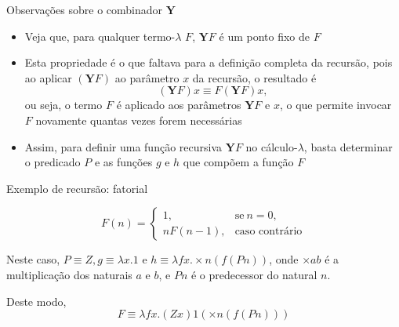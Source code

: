 \begin{frame}[fragile]{Observações sobre o combinador $\mathbf{Y}$}

    \begin{itemize}
        \item Veja que, para qualquer termo-$\lambda$ $F$, $\mathbf{Y}F$ é um ponto fixo de $F$

        \item Esta propriedade é o que faltava para a definição completa da recursão, pois
            ao aplicar $(\mathbf{Y}F)$ ao parâmetro $x$ da recursão, o resultado é 
        \[
            (\mathbf{Y}F)x \equiv F(\mathbf{Y}F)x,
        \]
        ou seja, o termo $F$ é aplicado aos parâmetros $\mathbf{Y}F$ e $x$, o que permite invocar
        $F$ novamente quantas vezes forem necessárias

        \item Assim, para definir uma função recursiva $\mathbf{Y}F$ no cálculo-$\lambda$, basta 
        determinar o predicado $P$ e as funções $g$ e $h$ que compõem a função $F$
    \end{itemize}

\end{frame}

\begin{frame}[fragile]{Exemplo de recursão: fatorial}

    \begin{huge}
    \[
        F(n) =  \left\lbrace \begin{array}{ll}
                    1, & \mbox{se}\ n = 0, \\
                    nF(n - 1), & \mbox{caso contrário}
                \end{array} \right.
    \]
    \end{huge}

    \vspace{0.5in}

    Neste caso, $P\equiv Z, g \equiv \lambda x.1$ e $h\equiv \lambda fx.\times n(f(Pn))$, onde
    $\times ab$ é a multiplicação dos naturais $a$ e $b$, e $Pn$ é o predecessor do natural $n$. 

    \vspace{0.1in}
    Deste modo,
    \[
        F \equiv \lambda fx.(Zx)1(\times n(f(Pn)))
    \]
\end{frame}

